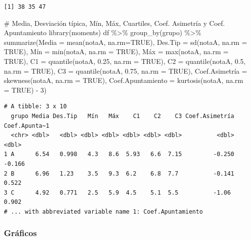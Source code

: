 \documentclass[
  a4paper,
]{scrreport}
\newenvironment{Shaded}{\begin{snugshade}}{\end{snugshade}}
\newcommand{\AttributeTok}[1]{\textcolor[rgb]{0.40,0.45,0.13}{#1}}
\newcommand{\CommentTok}[1]{\textcolor[rgb]{0.37,0.37,0.37}{#1}}
\newcommand{\ConstantTok}[1]{\textcolor[rgb]{0.56,0.35,0.01}{#1}}
\newcommand{\DecValTok}[1]{\textcolor[rgb]{0.68,0.00,0.00}{#1}}
\newcommand{\FloatTok}[1]{\textcolor[rgb]{0.68,0.00,0.00}{#1}}
\newcommand{\FunctionTok}[1]{\textcolor[rgb]{0.28,0.35,0.67}{#1}}
\newcommand{\NormalTok}[1]{\textcolor[rgb]{0.00,0.23,0.31}{#1}}
\newcommand{\OtherTok}[1]{\textcolor[rgb]{0.00,0.23,0.31}{#1}}
\newcommand{\SpecialCharTok}[1]{\textcolor[rgb]{0.37,0.37,0.37}{#1}}
\theoremstyle{definition}
\theoremstyle{definition}
\theoremstyle{remark}
\begin{document}
\begin{verbatim}
[1] 38 35 47
\end{verbatim}

\begin{Shaded}
\begin{Highlighting}[]
\CommentTok{\# Media, Desviación típica, Mín, Máx, Cuartiles, Coef. Asimetría y Coef. Apuntamiento}
\FunctionTok{library}\NormalTok{(moments)}
\NormalTok{df }\SpecialCharTok{\%\textgreater{}\%} \FunctionTok{group\_by}\NormalTok{(grupo) }\SpecialCharTok{\%\textgreater{}\%} \FunctionTok{summarize}\NormalTok{(}\AttributeTok{Media =} \FunctionTok{mean}\NormalTok{(notaA, }\AttributeTok{na.rm=}\ConstantTok{TRUE}\NormalTok{), }\AttributeTok{Des.Tip =} \FunctionTok{sd}\NormalTok{(notaA, }\AttributeTok{na.rm =} \ConstantTok{TRUE}\NormalTok{), Mín }\OtherTok{=} \FunctionTok{min}\NormalTok{(notaA, }\AttributeTok{na.rm =} \ConstantTok{TRUE}\NormalTok{), Máx }\OtherTok{=} \FunctionTok{max}\NormalTok{(notaA, }\AttributeTok{na.rm =} \ConstantTok{TRUE}\NormalTok{), }\AttributeTok{C1 =} \FunctionTok{quantile}\NormalTok{(notaA, }\FloatTok{0.25}\NormalTok{, }\AttributeTok{na.rm =} \ConstantTok{TRUE}\NormalTok{), }\AttributeTok{C2 =} \FunctionTok{quantile}\NormalTok{(notaA, }\FloatTok{0.5}\NormalTok{, }\AttributeTok{na.rm =} \ConstantTok{TRUE}\NormalTok{), }\AttributeTok{C3 =} \FunctionTok{quantile}\NormalTok{(notaA, }\FloatTok{0.75}\NormalTok{, }\AttributeTok{na.rm =} \ConstantTok{TRUE}\NormalTok{), Coef.Asimetría }\OtherTok{=} \FunctionTok{skewness}\NormalTok{(notaA, }\AttributeTok{na.rm =} \ConstantTok{TRUE}\NormalTok{), }\AttributeTok{Coef.Apuntamiento =} \FunctionTok{kurtosis}\NormalTok{(notaA, }\AttributeTok{na.rm =} \ConstantTok{TRUE}\NormalTok{) }\SpecialCharTok{{-}} \DecValTok{3}\NormalTok{)}
\end{Highlighting}
\end{Shaded}

\begin{verbatim}
# A tibble: 3 x 10
  grupo Media Des.Tip   Mín   Máx    C1    C2    C3 Coef.Asimetría Coef.Apunta~1
  <chr> <dbl>   <dbl> <dbl> <dbl> <dbl> <dbl> <dbl>          <dbl>         <dbl>
1 A      6.54   0.998   4.3   8.6  5.93   6.6  7.15         -0.250        -0.166
2 B      6.96   1.23    3.5   9.3  6.2    6.8  7.7          -0.141         0.522
3 C      4.92   0.771   2.5   5.9  4.5    5.1  5.5          -1.06          0.902
# ... with abbreviated variable name 1: Coef.Apuntamiento
\end{verbatim}

\hypertarget{gruxe1ficos-4}{%
\subsubsection{Gráficos}\label{gruxe1ficos-4}}
\end{document}
